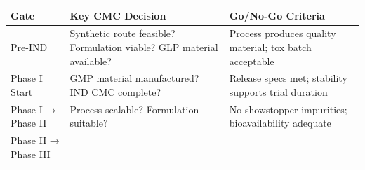 \documentclass[
  11pt,
  a4paper,
]{report}
\begin{document}
\begin{longtable}[]{@{}lll@{}}
\toprule
\begin{minipage}[b]{0.13\columnwidth}\raggedright
Gate\strut
\end{minipage} & \begin{minipage}[b]{0.38\columnwidth}\raggedright
Key CMC Decision\strut
\end{minipage} & \begin{minipage}[b]{0.40\columnwidth}\raggedright
Go/No-Go Criteria\strut
\end{minipage}\tabularnewline
\midrule
\endhead
\begin{minipage}[t]{0.13\columnwidth}\raggedright
Pre-IND\strut
\end{minipage} & \begin{minipage}[t]{0.38\columnwidth}\raggedright
Synthetic route feasible? Formulation viable? GLP material
available?\strut
\end{minipage} & \begin{minipage}[t]{0.40\columnwidth}\raggedright
Process produces quality material; tox batch acceptable\strut
\end{minipage}\tabularnewline
\begin{minipage}[t]{0.13\columnwidth}\raggedright
Phase I Start\strut
\end{minipage} & \begin{minipage}[t]{0.38\columnwidth}\raggedright
GMP material manufactured? IND CMC complete?\strut
\end{minipage} & \begin{minipage}[t]{0.40\columnwidth}\raggedright
Release specs met; stability supports trial duration\strut
\end{minipage}\tabularnewline
\begin{minipage}[t]{0.13\columnwidth}\raggedright
Phase I → Phase II\strut
\end{minipage} & \begin{minipage}[t]{0.38\columnwidth}\raggedright
Process scalable? Formulation suitable?\strut
\end{minipage} & \begin{minipage}[t]{0.40\columnwidth}\raggedright
No showstopper impurities; bioavailability adequate\strut
\end{minipage}\tabularnewline
\begin{minipage}[t]{0.13\columnwidth}\raggedright
Phase II → Phase III\strut
\end{minipage} & \begin{minipage}[t]{0.38\columnwidth}\raggedright

\end{minipage}
\end{longtable}
\end{document}
